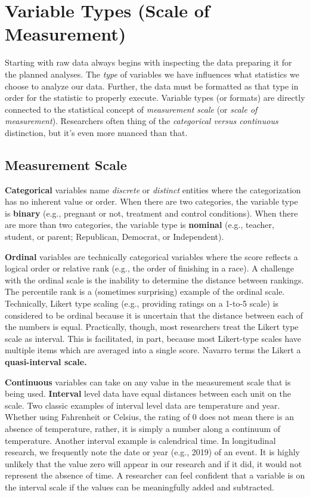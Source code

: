 \documentclass[
  11pt,
]{book}
\begin{document}
\hypertarget{variable-types-scale-of-measurement}{%
\section{Variable Types (Scale of Measurement)}\label{variable-types-scale-of-measurement}}

Starting with raw data always begins with inspecting the data preparing it for the planned analyses. The \emph{type} of variables we have influences what statistics we choose to analyze our data. Further, the data must be formatted as that type in order for the statistic to properly execute. Variable types (or formats) are directly connected to the statistical concept of \emph{measurement scale} (or \emph{scale of measurement}). Researchers often thing of the \emph{categorical versus continuous} distinction, but it's even more nuanced than that.

\hypertarget{measurement-scale}{%
\subsection{Measurement Scale}\label{measurement-scale}}

\textbf{Categorical} variables name \emph{discrete} or \emph{distinct} entities where the categorization has no inherent value or order. When there are two categories, the variable type is \textbf{binary} (e.g., pregnant or not, treatment and control conditions). When there are more than two categories, the variable type is \textbf{nominal} (e.g., teacher, student, or parent; Republican, Democrat, or Independent).

\textbf{Ordinal} variables are technically categorical variables where the score reflects a logical order or relative rank (e.g., the order of finishing in a race). A challenge with the ordinal scale is the inability to determine the distance between rankings. The percentile rank is a (sometimes surprising) example of the ordinal scale. Technically, Likert type scaling (e.g., providing ratings on a 1-to-5 scale) is considered to be ordinal because it is uncertain that the distance between each of the numbers is equal. Practically, though, most researchers treat the Likert type scale as interval. This is facilitated, in part, because most Likert-type scales have multiple items which are averaged into a single score. Navarro\citeyearpar{navarro_book_2020} terms the Likert a \textbf{quasi-interval scale.}

\textbf{Continuous} variables can take on any value in the measurement scale that is being used. \textbf{Interval} level data have equal distances between each unit on the scale. Two classic examples of interval level data are temperature and year. Whether using Fahrenheit or Celsius, the rating of 0 does not mean there is an absence of temperature, rather, it is simply a number along a continuum of temperature. Another interval example is calendrical time. In longitudinal research, we frequently note the date or year (e.g., 2019) of an event. It is highly unlikely that the value zero will appear in our research and if it did, it would not represent the absence of time. A researcher can feel confident that a variable is on the interval scale if the values can be meaningfully added and subtracted.
\end{document}
